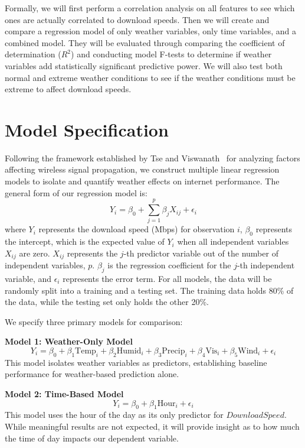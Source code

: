 \documentclass[11pt]{report}
\begin{document}
Formally, we will first perform a correlation analysis on all features to see which ones are actually correlated to download speeds. Then we will create and compare a regression model of only weather variables, only time variables, and a combined model. They will be evaluated through comparing the coefficient of determination ($R^2$) and conducting model F-tests to determine if weather variables add statistically significant predictive power. We will also test both normal and extreme weather conditions to see if the weather conditions must be extreme to affect download speeds. 

\section{Model Specification}
Following the framework established by Tse and Viswanath~\cite{tse2005fundamentals} for analyzing factors affecting wireless signal propagation, we construct multiple linear regression models to isolate and quantify weather effects on internet performance. The general form of our regression model is:
\begin{equation}
Y_i = \beta_0 + \sum_{j=1}^{p} \beta_j X_{ij} + \epsilon_i
\end{equation}
where $Y_i$ represents the download speed (Mbps) for observation $i$, $\beta_0$ represents the intercept, which is the expected value of $Y_i$ when all independent variables $X_{ij}$ are zero. $X_{ij}$ represents the $j$-th predictor variable out of the number of independent variables, $p$. $\beta_j$ is the regression coefficient for the $j$-th independent variable, and $\epsilon_i$ represents the error term. For all models, the data will be randomly split into a training and a testing set. The training data holds 80\% of the data, while the testing set only holds the other 20\%.

We specify three primary models for comparison:

\textbf{Model 1: Weather-Only Model}
\begin{equation}
Y_i = \beta_0 + \beta_1 \text{Temp}_i + \beta_2 \text{Humid}_i + \beta_3 \text{Precip}_i + \beta_4 \text{Vis}_i + \beta_5 \text{Wind}_i + \epsilon_i
\end{equation}
This model isolates weather variables as predictors, establishing baseline performance for weather-based prediction alone.

\textbf{Model 2: Time-Based Model}
\begin{equation}
Y_i = \beta_0 + \beta_1 \text{Hour}_i + \epsilon_i
\end{equation}
This model uses the hour of the day as its only predictor for $DownloadSpeed$. While meaningful results are not expected, it will provide insight as to how much the time of day impacts our dependent variable.
\end{document}
